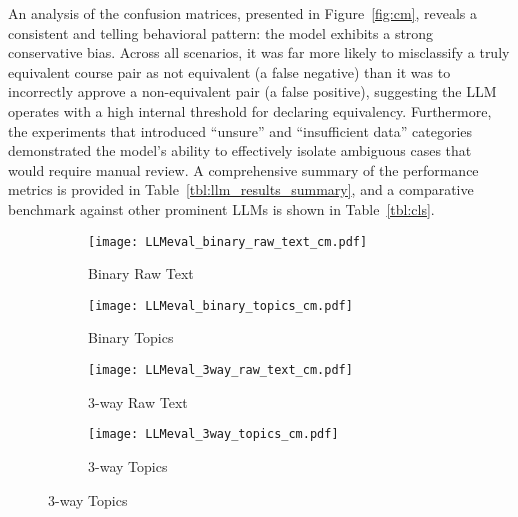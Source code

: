 An analysis of the confusion matrices, presented in Figure~\ref{fig:cm}, reveals a consistent and telling behavioral pattern: the model exhibits a strong conservative bias. Across all scenarios, it was far more likely to misclassify a truly equivalent course pair as not equivalent (a false negative) than it was to incorrectly approve a non-equivalent pair (a false positive), suggesting the LLM operates with a high internal threshold for declaring equivalency. Furthermore, the experiments that introduced ``unsure'' and ``insufficient data'' categories demonstrated the model's ability to effectively isolate ambiguous cases that would require manual review. A comprehensive summary of the performance metrics is provided in Table~\ref{tbl:llm_results_summary}, and a comparative benchmark against other prominent LLMs is shown in Table~\ref{tbl:cls}.
\begin{figure}[tb]
    \captionsetup{skip=5pt}
    \centering
    \begin{subfigure}[b]{0.497\textwidth}
        \centering
        \texttt{[image: LLMeval\_binary\_raw\_text\_cm.pdf]}
        \caption{Binary Raw Text}
        \label{fig:sub_brt}
    \end{subfigure}
    \hfill
    \begin{subfigure}[b]{0.497\textwidth}
        \centering
        \texttt{[image: LLMeval\_binary\_topics\_cm.pdf]}
        \caption{Binary Topics}
        \label{fig:sub_brt}
    \end{subfigure}

    \vspace{2mm}

    \begin{subfigure}[b]{0.497\textwidth}
        \centering
        \texttt{[image: LLMeval\_3way\_raw\_text\_cm.pdf]}
        \caption{3-way Raw Text}
        \label{fig:sub_brt}
    \end{subfigure}
    \hfill
    \begin{subfigure}[b]{0.497\textwidth}
        \centering
        \texttt{[image: LLMeval\_3way\_topics\_cm.pdf]}
        \caption{3-way Topics}
        \label{fig:sub_brt}
    \end{subfigure}

    \vspace{2mm}


\end{figure}

